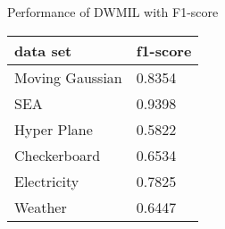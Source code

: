 
\begin{frame}{Performance of DWMIL with F1-score}

\begin{table}[h]
    \centering
    \begin{tabular}{ | l | l | }
    \hline
    data set & f1-score \\ \hline \hline
    Moving Gaussian & 0.8354 \\ \hline
    SEA & 0.9398 \\ \hline
    Hyper Plane & 0.5822 \\ \hline
    Checkerboard & 0.6534 \\ \hline
    Electricity & 0.7825 \\ \hline
    Weather & 0.6447 \\ \hline
    \end{tabular}
\end{table}

\end{frame}

